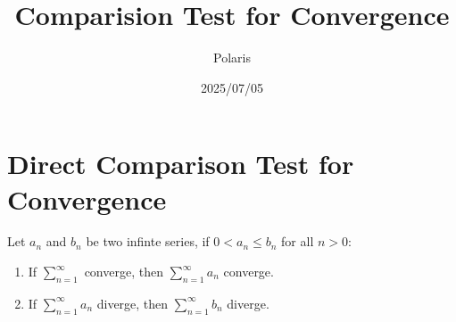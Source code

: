 \documentclass{article}
\title{Comparision Test for Convergence}
\author{Polaris}
\date{2025/07/05}
\numberwithin{equation}{section}
\begin{document}
\maketitle

\section{Direct Comparison Test for Convergence}
Let $a_n$ and $b_n$ be two infinte series, if $0 < a_n \leq b_n$ for all $n>0$:

\begin{enumerate}
    \item If $\displaystyle \sum_{n = 1}^{\infty}$ converge, then $\displaystyle \sum_{n = 1}^{\infty} a_n$ converge.
    \item If $\displaystyle \sum_{n = 1}^{\infty} a_n$ diverge, then $\displaystyle \sum_{n = 1}^{\infty} b_n$ diverge.
\end{enumerate}
\end{document}
